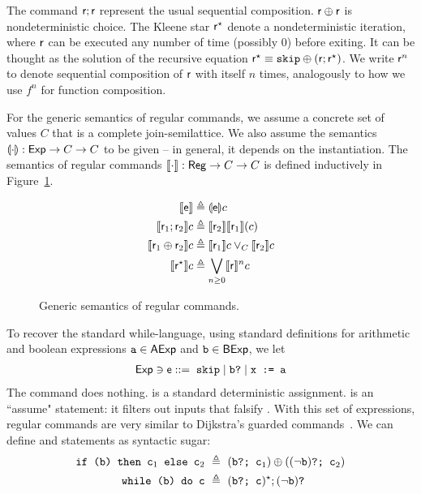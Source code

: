 The command $\mathsf{r}; \mathsf{r}$ represent the usual sequential composition. $\mathsf{r} \oplus \mathsf{r}$ is nondeterministic choice. The Kleene star $\mathsf{r}^\star$ denote a nondeterministic iteration, where $\mathsf{r}$ can be executed any number of time (possibly 0) before exiting. It can be thought as the solution of the recursive equation $\mathsf{r}^\star \equiv \texttt{skip} \oplus (\mathsf{r}; \mathsf{r}^{\star})$.
We write $\mathsf{r}^n$ to denote sequential composition of $\mathsf{r}$ with itself $n$ times, analogously to how we use $f^n$ for function composition.

For the generic semantics of regular commands, we assume a concrete set of values $C$ that is a complete join-semilattice. We also assume the semantics $\llparenthesis\cdot\rrparenthesis : \mathsf{Exp} \rightarrow C \rightarrow C$ to be given -- in general, it depends on the instantiation.
The semantics of regular commands $\llbracket\cdot\rrbracket : \mathsf{Reg} \rightarrow C \rightarrow C$ is defined inductively in Figure~\ref{fig:bg:regcom-sem}.
\begin{figure}[t]
	\begin{align*}
		\llbracket\mathsf{e}\rrbracket                      & \triangleq \llparenthesis\mathsf{e}\rrparenthesis c                         \\
		\llbracket\mathsf{r}_1 ; \mathsf{r}_2 \rrbracket c       & \triangleq \llbracket\mathsf{r}_2\rrbracket\llbracket\mathsf{r}_1\rrbracket (c)       \\
		\llbracket\mathsf{r}_1 \oplus \mathsf{r}_2\rrbracket c & \triangleq \llbracket\mathsf{r}_1\rrbracket c \vee_C \llbracket\mathsf{r}_2\rrbracket c \\
		\llbracket\mathsf{r}^\star\rrbracket c              & \triangleq \bigvee_{n \ge 0} \llbracket\mathsf{r}\rrbracket^n c
	\end{align*}
	\caption{Generic semantics of regular commands.}
	\label{fig:bg:regcom-sem}
\end{figure}

To recover the standard while-language, using standard definitions for arithmetic and boolean expressions $\texttt{a} \in \mathsf{AExp}$ and $\texttt{b} \in \mathsf{BExp}$, we let
\begin{align*}
	\mathsf{Exp} \ni \mathsf{e} ::= \; \texttt{skip} \mid \texttt{b?} \mid \texttt{x := a}
\end{align*}
The command  does nothing.  is a standard deterministic assignment.  is an ``assume" statement: it filters out inputs that falsify .
With this set of expressions, regular commands are very similar to Dijkstra's guarded commands~\cite{Dijkstra75}.
We can define  and  statements as syntactic sugar:
\begin{align*}
	\code{if (b) then } \code{c}_1 \code{ else } \code{c}_2 & \ \eqdef\  (\code{b?; c}_1) \regplus ((\lnot \code{b})\code{?; c}_2) \\
	\code{while (b) do c}                                   & \ \eqdef\  (\code{b?; c})^\kstar; (\lnot \code{b})\code{?}
\end{align*}

